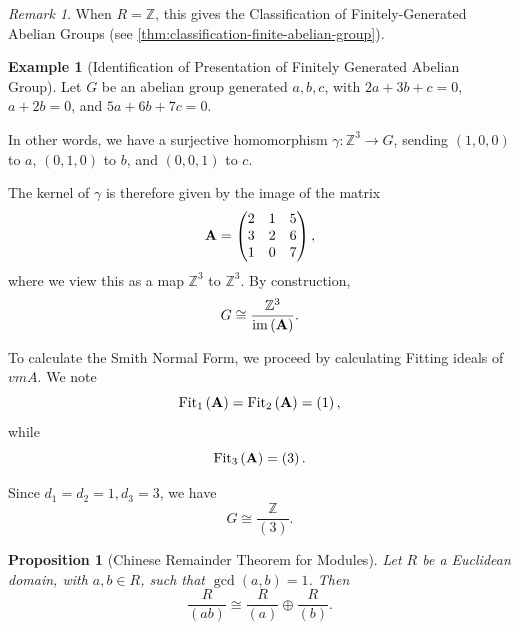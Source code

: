 \documentclass{article}
\newtheorem{proposition}[theorem]{Proposition}
\theoremstyle{definition}
\newtheorem*{example*}{Example}
\theoremstyle{remark}
\newtheorem{remark}[theorem]{Remark}
\newcommand{\pqty}[1]{\left(#1\right)}
\newcommand{\flatfrac}[2]{\frac{#1}{#2}}
\newcommand{\functiondomain}[3]{#1:#2\to #3}
\newcommand{\pmqty}[1]{\begin{pmatrix}#1\end{pmatrix}}
\newcommand{\isomorphic}{\cong}
\newcommand{\ZZ}{\mathbb{Z}}
\newcommand{\Fit}{\operatorname{Fit}}
\newcommand{\img}{\operatorname{im}}
\begin{document}
\begin{remark}
    When \(R = \ZZ\), this gives the Classification of Finitely-Generated Abelian Groups (see \autoref{thm:classification-finite-abelian-group}).
\end{remark}

\begin{example*}[Identification of Presentation of Finitely Generated Abelian Group]
    Let \(G\) be an abelian group generated \(a, b, c\), with \(2a + 3b + c = 0\), \(a + 2b = 0\), and \(5a + 6b + 7c = 0\).

    In other words, we have a surjective homomorphism \(\functiondomain{\gamma}{\ZZ^3}{G}\), sending \(\pqty{1, 0, 0}\) to \(a\), \(\pqty{0, 1, 0}\) to \(b\), and \(\pqty{0, 0, 1}\) to \(c\).

    The kernel of \(\gamma\) is therefore given by the image of the matrix
    \[
        \vb{A} = \pmqty{
            2 & 1 & 5 \\
            3 & 2 & 6 \\
            1 & 0 & 7
        },
    \]
    where we view this as a map \(\ZZ^3\) to \(\ZZ^3\). By construction,
    \[
        G \isomorphic \flatfrac{\ZZ^3}{\img \pqty{\vb{A}}}.
    \]

    To calculate the Smith Normal Form, we proceed by calculating Fitting ideals of 
    \(vm{A}\). We note
    \[
        \Fit_1 \pqty{\vb{A}} = \Fit_2 \pqty{\vb{A}} = \pqty{1},
    \]
    while
    \[
        \Fit_3 \pqty{\vb{A}} = \pqty{3}.
    \]

    Since \(d_1 = d_2 = 1, d_3 = 3\), we have
    \[
        G \isomorphic \flatfrac{\ZZ}{\pqty{3}}.
    \]
\end{example*}

\begin{proposition}[Chinese Remainder Theorem for Modules]
    \label{prop:crt-modules}%
    Let \(R\) be a Euclidean domain, with \(a, b \in R\), such that \(\gcd\pqty{a, b} = 1\). Then
    \[
        \flatfrac{R}{\pqty{ab}} \isomorphic \flatfrac{R}{\pqty{a}} \oplus \flatfrac{R}{\pqty{b}}.
    \]
\end{proposition}
\end{document}

